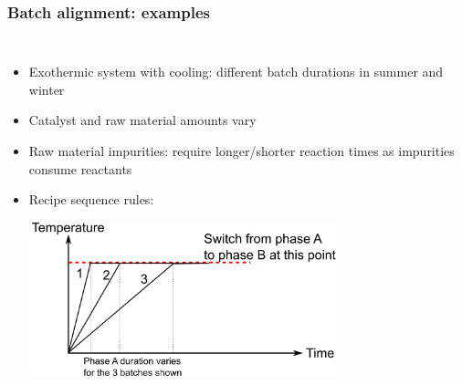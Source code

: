 \begin{frame}\frametitle{Batch alignment: examples}

\begin{columns}
	
	
		\small
		\begin{itemize}
			\item	Exothermic system with cooling: different batch durations in summer and winter

			\item	Catalyst and raw material amounts vary 

			\item	Raw material impurities: require longer/shorter reaction times as impurities consume reactants
			
			\item	Recipe sequence rules:

					\begin{center}
						\includegraphics[width=0.7\textwidth]{images/alignment-due-to-phase-switching.png}
					\end{center}
		\end{itemize}
		\vspace{12pt}
		
	

\end{columns}
\end{frame}
